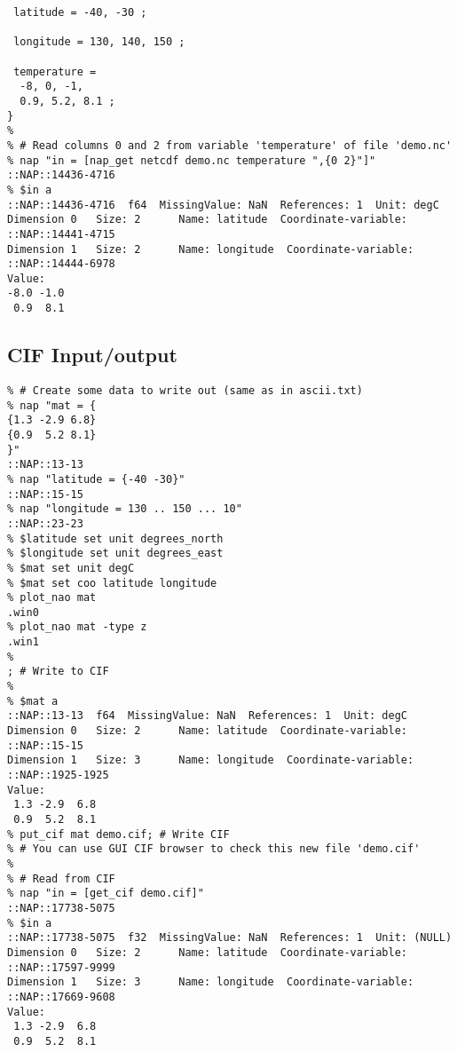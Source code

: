 \begin{verbatim}
 latitude = -40, -30 ;

 longitude = 130, 140, 150 ;

 temperature =
  -8, 0, -1,
  0.9, 5.2, 8.1 ;
}
% 
% # Read columns 0 and 2 from variable 'temperature' of file 'demo.nc'
% nap "in = [nap_get netcdf demo.nc temperature ",{0 2}"]"
::NAP::14436-4716
% $in a
::NAP::14436-4716  f64  MissingValue: NaN  References: 1  Unit: degC
Dimension 0   Size: 2      Name: latitude  Coordinate-variable: ::NAP::14441-4715
Dimension 1   Size: 2      Name: longitude  Coordinate-variable: ::NAP::14444-6978
Value:
-8.0 -1.0
 0.9  8.1
\end{verbatim}

\subsection{CIF Input/output}

    \begin{verbatim}
% # Create some data to write out (same as in ascii.txt)
% nap "mat = {
{1.3 -2.9 6.8}
{0.9  5.2 8.1}
}"
::NAP::13-13
% nap "latitude = {-40 -30}"
::NAP::15-15
% nap "longitude = 130 .. 150 ... 10"
::NAP::23-23
% $latitude set unit degrees_north
% $longitude set unit degrees_east
% $mat set unit degC
% $mat set coo latitude longitude
% plot_nao mat
.win0
% plot_nao mat -type z
.win1
% 
; # Write to CIF
% 
% $mat a
::NAP::13-13  f64  MissingValue: NaN  References: 1  Unit: degC
Dimension 0   Size: 2      Name: latitude  Coordinate-variable: ::NAP::15-15
Dimension 1   Size: 3      Name: longitude  Coordinate-variable: ::NAP::1925-1925
Value:
 1.3 -2.9  6.8
 0.9  5.2  8.1
% put_cif mat demo.cif; # Write CIF
% # You can use GUI CIF browser to check this new file 'demo.cif'
% 
% # Read from CIF
% nap "in = [get_cif demo.cif]"
::NAP::17738-5075
% $in a
::NAP::17738-5075  f32  MissingValue: NaN  References: 1  Unit: (NULL)
Dimension 0   Size: 2      Name: latitude  Coordinate-variable: ::NAP::17597-9999
Dimension 1   Size: 3      Name: longitude  Coordinate-variable: ::NAP::17669-9608
Value:
 1.3 -2.9  6.8
 0.9  5.2  8.1
\end{verbatim}

